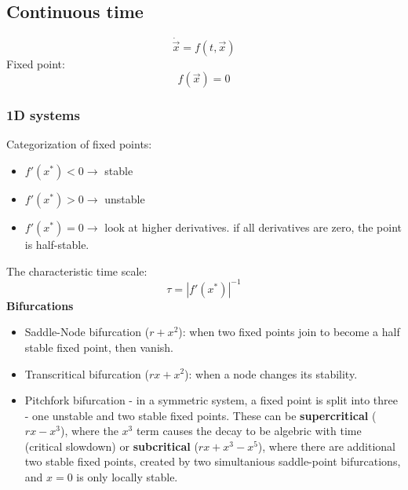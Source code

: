 \documentclass[twocolumn]{article}
\begin{document}
\subsection{Continuous time}
\begin{equation}
    \dot{\vec{x}} = f(t, \vec{x})
\end{equation}
Fixed point:
\begin{equation}
    f(\vec{x}) = 0
\end{equation}
\subsubsection{1D systems}
Categorization of fixed points:
\begin{itemize}
    \item $f'(x^*) < 0 \rightarrow$ stable
    \item $f'(x^*) > 0 \rightarrow$ unstable
    \item $f'(x^*) = 0 \rightarrow$ look at higher derivatives. if all derivatives are zero, the point is half-stable.
\end{itemize}
The characteristic time scale:
\begin{equation}
    \tau = \left|f'(x^*)\right|^{-1}
\end{equation}
\textbf{Bifurcations}
\begin{itemize}
    \item Saddle-Node bifurcation ($r + x^2$): when two fixed points join to become a half stable fixed point, then vanish.
    \item Transcritical bifurcation ($rx + x^2$): when a node changes its stability.
    \item Pitchfork bifurcation - in a symmetric system, a fixed point is split into three - one unstable and two stable fixed points.
    \newline
    These can be \textbf{supercritical} ($rx - x^3$), where the $x^3$ term causes the decay to be algebric with time (critical slowdown) or \textbf{subcritical} ($rx + x^3 - x^5$), where there are additional two stable fixed points, created by two simultanious saddle-point bifurcations, and $x = 0$ is only locally stable.
\end{itemize}
\end{document}
